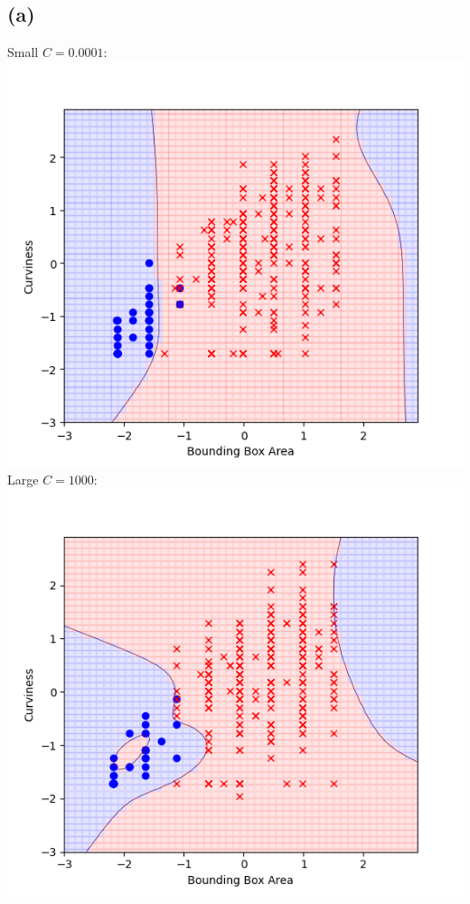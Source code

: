 \documentclass{article}
\begin{document}
	\subsection*{(a)}
		Small $C = 0.0001$:\\
		\includegraphics[scale=0.7]{4a1}\\
		Large $C = 1000$:\\
		\includegraphics[scale=0.7]{4a2}
		
\end{document}
